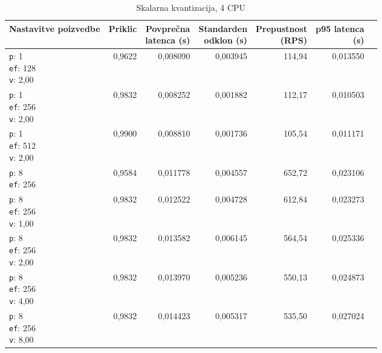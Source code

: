\begin{table}[htbp]
  \centering
\small
  \caption{Skalarna kvantizacija, 4 CPU}
  \label{tab:single-4cpu-4ram:sq:qdrant-dipl-baseline-tenant-subgraph-sq-ext-m16-ef-128-random-768-100-tenants-extended-upload-2026-08-19-23-07-01.json}
  \begin{tabularx}{\textwidth}{Xrrrrrr}
    \toprule
    Nastavitve poizvedbe & Priklic & \makecell{Povprečna\\latenca (s)} & \makecell{Standarden\\odklon (s)} & \makecell{Prepustnost\\(RPS)} & \makecell{p95 latenca\\(s)}  \\
    \midrule
    \makecell{\texttt{p}: 1\\\texttt{ef}: 128\\\texttt{v}: 2,00} & 0,9622 & 0,008090 & 0,003945 & 114,94 & 0,013550 \\
    \makecell{\texttt{p}: 1\\\texttt{ef}: 256\\\texttt{v}: 2,00} & 0,9832 & 0,008252 & 0,001882 & 112,17 & 0,010503 \\
    \makecell{\texttt{p}: 1\\\texttt{ef}: 512\\\texttt{v}: 2,00} & 0,9900 & 0,008810 & 0,001736 & 105,54 & 0,011171 \\
    \makecell{\texttt{p}: 8\\\texttt{ef}: 256} & 0,9584 & 0,011778 & 0,004557 & 652,72 & 0,023106 \\
    \makecell{\texttt{p}: 8\\\texttt{ef}: 256\\\texttt{v}: 1,00} & 0,9832 & 0,012522 & 0,004728 & 612,84 & 0,023273 \\
    \makecell{\texttt{p}: 8\\\texttt{ef}: 256\\\texttt{v}: 2,00} & 0,9832 & 0,013582 & 0,006145 & 564,54 & 0,025336 \\
    \makecell{\texttt{p}: 8\\\texttt{ef}: 256\\\texttt{v}: 4,00} & 0,9832 & 0,013970 & 0,005236 & 550,13 & 0,024873 \\
    \makecell{\texttt{p}: 8\\\texttt{ef}: 256\\\texttt{v}: 8,00} & 0,9832 & 0,014423 & 0,005317 & 535,50 & 0,027024 \\

\end{tabularx}
\end{table}
